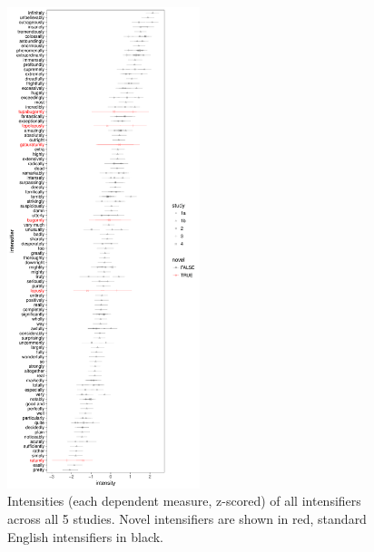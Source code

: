 \begin{figure}[hbt]
\begin{center}
\includegraphics[width=0.5\textwidth]{images/intensities.pdf}
\end{center}
\caption{Intensities (each dependent measure, z-scored) of all intensifiers across all 5 studies. Novel intensifiers are shown in red, standard English intensifiers in black.}
\label{fig:intensities}
\end{figure}
